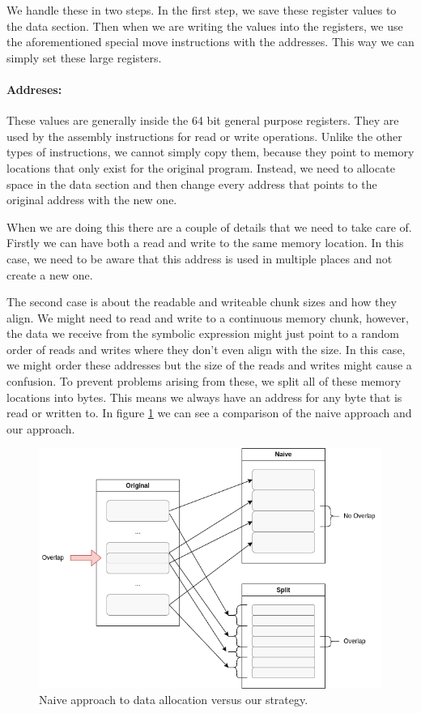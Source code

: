We handle these in two steps.
In the first step, we save these register values to the data section.
Then when we are writing the values into the registers, we use the aforementioned special move instructions with the addresses.
This way we can simply set these large registers.

\paragraph{Addreses:}
These values are generally inside the 64 bit general purpose registers.
They are used by the assembly instructions for read or write operations.
Unlike the other types of instructions, we cannot simply copy them, because they point to memory locations that only exist for the original program.
Instead, we need to allocate space in the data section and then change every address that points to the original address with the new one.

When we are doing this there are a couple of details that we need to take care of.
Firstly we can have both a read and write to the same memory location.
In this case, we need to be aware that this address is used in multiple places and not create a new one.

The second case is about the readable and writeable chunk sizes and how they align.
We might need to read and write to a continuous memory chunk, however, the data we receive from the symbolic expression might just point to a random order of reads and writes where they don't even align with the size.
In this case, we might order these addresses but the size of the reads and writes might cause a confusion.
To prevent problems arising from these, we split all of these memory locations into bytes.
This means we always have an address for any byte that is read or written to.
In figure \ref{fig:addr_match} we can see a comparison of the naive approach and our approach.

\begin{figure}[ht]
    \centering
    \includegraphics[width=0.8\linewidth]{figures/alloc2}
    \caption{Naive approach to data allocation versus our strategy.}
    \label{fig:addr_match}
\end{figure}

